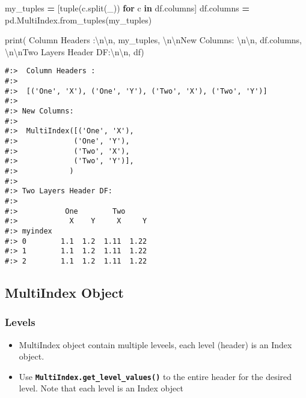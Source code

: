 \documentclass[
]{book}
\newenvironment{Shaded}{\begin{snugshade}}{\end{snugshade}}
\newcommand{\BuiltInTok}[1]{#1}
\newcommand{\CharTok}[1]{\textcolor[rgb]{0.5,0.5,0.5}{#1}}
\newcommand{\ControlFlowTok}[1]{\textcolor[rgb]{0.27,0.27,0.27}{\textbf{#1}}}
\newcommand{\KeywordTok}[1]{\textcolor[rgb]{0.27,0.27,0.27}{\textbf{#1}}}
\newcommand{\NormalTok}[1]{#1}
\newcommand{\OperatorTok}[1]{\textcolor[rgb]{0.43,0.43,0.43}{\textbf{#1}}}
\newcommand{\StringTok}[1]{\textcolor[rgb]{0.5,0.5,0.5}{#1}}
\providecommand{\tightlist}{%
  \setlength{\itemsep}{0pt}\setlength{\parskip}{0pt}}
\begin{document}
\begin{Shaded}
\begin{Highlighting}[]
\NormalTok{my\_tuples }\OperatorTok{=}\NormalTok{ [}\BuiltInTok{tuple}\NormalTok{(c.split(}\StringTok{\textquotesingle{}\_\textquotesingle{}}\NormalTok{)) }\ControlFlowTok{for}\NormalTok{ c }\KeywordTok{in}\NormalTok{ df.columns]}
\NormalTok{df.columns }\OperatorTok{=}\NormalTok{ pd.MultiIndex.from\_tuples(my\_tuples)}

\BuiltInTok{print}\NormalTok{(}\StringTok{\textquotesingle{} Column Headers :}\CharTok{\textbackslash{}n\textbackslash{}n}\StringTok{\textquotesingle{}}\NormalTok{,           my\_tuples,}
        \StringTok{\textquotesingle{}}\CharTok{\textbackslash{}n\textbackslash{}n}\StringTok{New Columns: }\CharTok{\textbackslash{}n\textbackslash{}n}\StringTok{\textquotesingle{}}\NormalTok{,         df.columns,}
        \StringTok{\textquotesingle{}}\CharTok{\textbackslash{}n\textbackslash{}n}\StringTok{Two Layers Header DF:}\CharTok{\textbackslash{}n\textbackslash{}n}\StringTok{\textquotesingle{}}\NormalTok{, df)}
\end{Highlighting}
\end{Shaded}

\begin{verbatim}
#:>  Column Headers :
#:> 
#:>  [('One', 'X'), ('One', 'Y'), ('Two', 'X'), ('Two', 'Y')] 
#:> 
#:> New Columns: 
#:> 
#:>  MultiIndex([('One', 'X'),
#:>             ('One', 'Y'),
#:>             ('Two', 'X'),
#:>             ('Two', 'Y')],
#:>            ) 
#:> 
#:> Two Layers Header DF:
#:> 
#:>           One        Two      
#:>            X    Y     X     Y
#:> myindex                      
#:> 0        1.1  1.2  1.11  1.22
#:> 1        1.1  1.2  1.11  1.22
#:> 2        1.1  1.2  1.11  1.22
\end{verbatim}

\hypertarget{multiindex-object}{%
\subsection{MultiIndex Object}\label{multiindex-object}}

\hypertarget{levels}{%
\subsubsection{Levels}\label{levels}}

\begin{itemize}
\tightlist
\item
  MultiIndex object contain multiple leveels, each level (header) is an Index object.\\
\item
  Use \textbf{\texttt{MultiIndex.get\_level\_values()}} to the entire header for the desired level. Note that each level is an Index object
\end{itemize}
\end{document}
